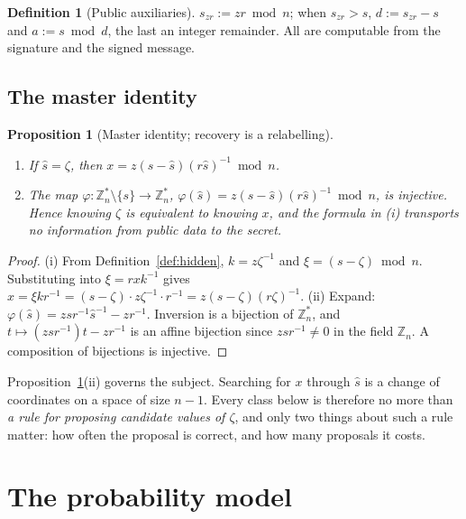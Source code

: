 \documentclass[11pt,a4paper]{article}
\theoremstyle{plain}
\newtheorem{proposition}[theorem]{Proposition}
\theoremstyle{definition}
\newtheorem{definition}[theorem]{Definition}
\theoremstyle{remark}
\newcommand{\Zs}{\mathbb{Z}_n^{*}}
\newcommand{\szr}{s_{zr}}
\begin{document}
\begin{definition}[Public auxiliaries]\label{def:aux}
$\szr := zr \bmod n$; when $\szr > s$, $d := \szr - s$ and $a := s \bmod d$, the last an integer
remainder. All are computable from the signature and the signed message.
\end{definition}

\subsection{The master identity}

\begin{proposition}[Master identity; recovery is a relabelling]\label{prop:master}
\begin{enumerate}[label=(\roman*),leftmargin=2.2em,itemsep=2pt]
\item If $\hat{s} = \zeta$, then $x = z(s-\hat{s})(r\hat{s})^{-1}\bmod n$.
\item The map $\varphi : \Zs\setminus\{s\} \to \Zs$, $\varphi(\hat s) = z(s-\hat s)(r\hat s)^{-1}
  \bmod n$, is injective. Hence knowing $\zeta$ is equivalent to knowing $x$, and the formula in
  (i) transports no information from public data to the secret.
\end{enumerate}
\end{proposition}

\begin{proof}
(i) From Definition~\ref{def:hidden}, $k = z\zeta^{-1}$ and $\xi = (s - \zeta)\bmod n$.
Substituting into $\xi = rxk^{-1}$ gives
$x = \xi k r^{-1} = (s-\zeta)\cdot z\zeta^{-1}\cdot r^{-1} = z(s-\zeta)(r\zeta)^{-1}$.
(ii) Expand: $\varphi(\hat s) = zsr^{-1}\hat s^{-1} - zr^{-1}$. Inversion is a bijection of $\Zs$,
and $t \mapsto (zsr^{-1})t - zr^{-1}$ is an affine bijection since $zsr^{-1}\neq 0$ in the field
$\mathbb{Z}_n$. A composition of bijections is injective.
\end{proof}

Proposition~\ref{prop:master}(ii) governs the subject. Searching for $x$ through $\hat s$ is a
change of coordinates on a space of size $n-1$. Every class below is therefore no more than
\emph{a rule for proposing candidate values of $\zeta$}, and only two things about such a rule
matter: how often the proposal is correct, and how many proposals it costs.

\section{The probability model}\label{sec:model}
\end{document}
